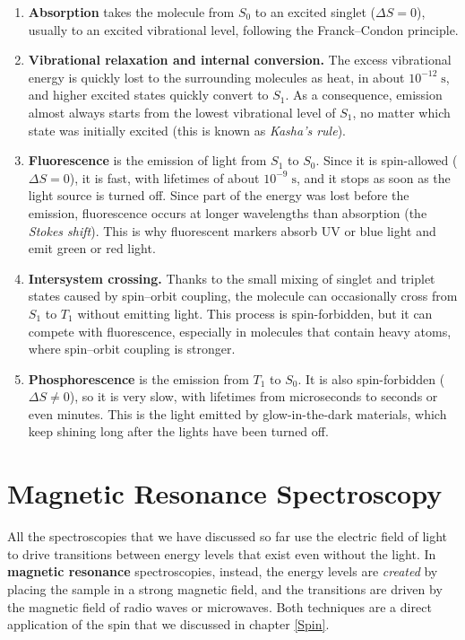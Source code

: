 \documentclass[
  english,
  9pt,
]{extbook}
\providecommand{\tightlist}{%
  \setlength{\itemsep}{0pt}\setlength{\parskip}{0pt}}
\theoremstyle{definition}
\theoremstyle{definition}
\theoremstyle{definition}
\theoremstyle{definition}
\theoremstyle{remark}
\begin{document}
\begin{enumerate}
\def\labelenumi{\arabic{enumi}.}
\tightlist
\item
  \textbf{Absorption} takes the molecule from \(S_0\) to an excited singlet (\(\Delta S=0\)), usually to an excited vibrational level, following the Franck--Condon principle.
\item
  \textbf{Vibrational relaxation and internal conversion.} The excess vibrational energy is quickly lost to the surrounding molecules as heat, in about \(10^{-12}\;\text{s}\), and higher excited states quickly convert to \(S_1\). As a consequence, emission almost always starts from the lowest vibrational level of \(S_1\), no matter which state was initially excited (this is known as \emph{Kasha's rule}).
\item
  \textbf{Fluorescence} is the emission of light from \(S_1\) to \(S_0\). Since it is spin-allowed (\(\Delta S=0\)), it is fast, with lifetimes of about \(10^{-9}\;\text{s}\), and it stops as soon as the light source is turned off. Since part of the energy was lost before the emission, fluorescence occurs at longer wavelengths than absorption (the \emph{Stokes shift}). This is why fluorescent markers absorb UV or blue light and emit green or red light.
\item
  \textbf{Intersystem crossing.} Thanks to the small mixing of singlet and triplet states caused by spin--orbit coupling, the molecule can occasionally cross from \(S_1\) to \(T_1\) without emitting light. This process is spin-forbidden, but it can compete with fluorescence, especially in molecules that contain heavy atoms, where spin--orbit coupling is stronger.
\item
  \textbf{Phosphorescence} is the emission from \(T_1\) to \(S_0\). It is also spin-forbidden (\(\Delta S\neq0\)), so it is very slow, with lifetimes from microseconds to seconds or even minutes. This is the light emitted by glow-in-the-dark materials, which keep shining long after the lights have been turned off.
\end{enumerate}

\section{Magnetic Resonance Spectroscopy}\label{magnetic-resonance-spectroscopy}

All the spectroscopies that we have discussed so far use the electric field of light to drive transitions between energy levels that exist even without the light. In \textbf{magnetic resonance} spectroscopies, instead, the energy levels are \emph{created} by placing the sample in a strong magnetic field, and the transitions are driven by the magnetic field of radio waves or microwaves. Both techniques are a direct application of the spin that we discussed in chapter \ref{Spin}.
\end{document}
